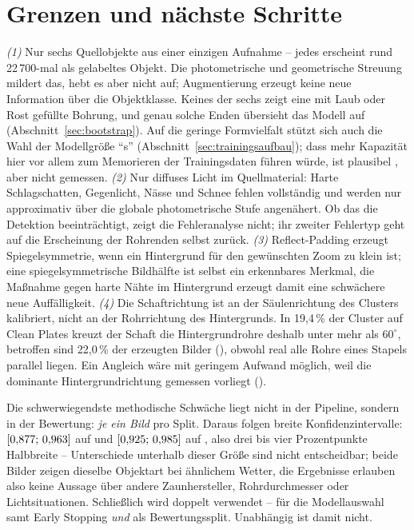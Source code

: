 \section{Grenzen und nächste Schritte}
\label{sec:grenzen}

 \emph{(1)} Nur sechs Quellobjekte aus einer
einzigen Aufnahme -- jedes erscheint rund 22\,700-mal als gelabeltes Objekt.
Die photometrische und geometrische Streuung mildert das, hebt es aber nicht
auf; Augmentierung erzeugt keine neue Information über die Objektklasse. Keines
der sechs zeigt eine mit Laub oder Rost gefüllte Bohrung, und genau solche
Enden übersieht das Modell auf  (Abschnitt~\ref{sec:bootstrap}). Auf
die geringe Formvielfalt stützt sich auch die Wahl der Modellgröße
\enquote{s} (Abschnitt~\ref{sec:trainingsaufbau}); dass mehr Kapazität hier vor
allem zum Memorieren der Trainingsdaten führen würde, ist plausibel
\parencite{zhang2017rethinking},
aber nicht gemessen. \emph{(2)} Nur diffuses Licht im Quellmaterial: Harte
Schlagschatten, Gegenlicht, Nässe und Schnee fehlen vollständig und werden nur
approximativ über die globale photometrische Stufe angenähert. Ob das die
Detektion beeinträchtigt, zeigt die Fehleranalyse nicht; ihr zweiter Fehlertyp
geht auf die Erscheinung der Rohrenden selbst zurück. \emph{(3)} Reflect-Padding erzeugt Spiegelsymmetrie, wenn ein
Hintergrund für den gewünschten Zoom zu klein ist; eine spiegelsymmetrische
Bildhälfte ist selbst ein erkennbares Merkmal, die Maßnahme gegen harte Nähte
im Hintergrund erzeugt damit eine schwächere neue Auffälligkeit. \emph{(4)} Die Schaftrichtung ist an der
Säulenrichtung des Clusters kalibriert, nicht an der Rohrrichtung des
Hintergrunds. In 19,4\,\% der Cluster auf Clean Plates kreuzt der Schaft die
Hintergrundrohre deshalb unter mehr als $60^\circ$, betroffen sind 22,0\,\% der
erzeugten Bilder (), obwohl real alle Rohre eines
Stapels parallel liegen. Ein Angleich wäre
mit geringem Aufwand möglich, weil die dominante Hintergrundrichtung gemessen
vorliegt ().

 Die schwerwiegendste methodische Schwäche liegt
nicht in der Pipeline, sondern in der Bewertung: \emph{je ein Bild} pro Split.
Daraus folgen breite Konfidenzintervalle: $[0{,}877;\,0{,}963]$ auf
 und $[0{,}925;\,0{,}985]$ auf , also drei bis
vier Prozentpunkte Halbbreite -- Unterschiede unterhalb dieser Größe sind nicht
entscheidbar; beide Bilder zeigen dieselbe Objektart bei ähnlichem
Wetter, die Ergebnisse erlauben also keine Aussage über andere Zaunhersteller,
Rohrdurchmesser oder Lichtsituationen. Schließlich wird  doppelt
verwendet -- für die Modellauswahl samt Early Stopping \emph{und} als
Bewertungssplit. Unabhängig ist  damit nicht.

